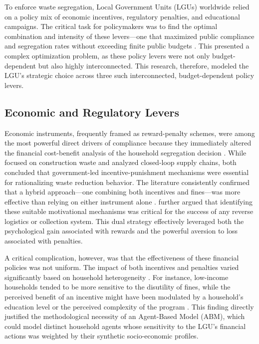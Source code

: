 
To enforce waste segregation, Local Government Units (LGUs) worldwide relied on a policy mix of economic incentives, regulatory penalties, and educational campaigns. The critical task for policymakers was to find the optimal combination and intensity of these levers—one that maximized public compliance and segregation rates without exceeding finite public budgets \citep{HeFu2021, Torkayesh2021}. This presented a complex optimization problem, as these policy levers were not only budget-dependent but also highly interconnected. This research, therefore, modeled the LGU's strategic choice across three such interconnected, budget-dependent policy levers.

\subsection{Economic and Regulatory Levers}
\setlength{\parindent}{2em}

Economic instruments, frequently framed as reward-penalty schemes, were among the most powerful direct drivers of compliance because they immediately altered the financial cost-benefit analysis of the household segregation decision \citep{MuZhang2021, Zhao2022}. While \citet{Cheng2022} focused on construction waste and \citet{Wang2023} analyzed closed-loop supply chains, both concluded that government-led incentive-punishment mechanisms were essential for rationalizing waste reduction behavior. The literature consistently confirmed that a hybrid approach—one combining both incentives and fines—was more effective than relying on either instrument alone \citep{Chen2023, MuZhang2021}. \citet{Rathore2021} further argued that identifying these suitable motivational mechanisms was critical for the success of any reverse logistics or collection system. This dual strategy effectively leveraged both the psychological gain associated with rewards and the powerful aversion to loss associated with penalties.

A critical complication, however, was that the effectiveness of these financial policies was not uniform. The impact of both incentives and penalties varied significantly based on household heterogeneity \citep{Chen2023, Zheng2022}. For instance, low-income households tended to be more sensitive to the disutility of fines, while the perceived benefit of an incentive might have been modulated by a household's education level or the perceived complexity of the program \citep{Zheng2022}. This finding directly justified the methodological necessity of an Agent-Based Model (ABM), which could model distinct household agents whose sensitivity to the LGU’s financial actions was weighted by their synthetic socio-economic profiles.


